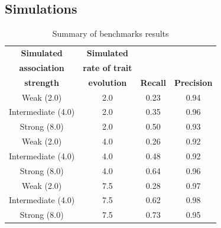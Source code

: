 \documentclass[]{article}
\begin{document}
\subsection*{Simulations}
\begin{table}[h!]
	\centering
	\caption{\label{tab:results} Summary of benchmarks results}	
	\small
	\begin{tabular}{cccc}
		\midrule
		\textbf{Simulated} & \textbf{Simulated} & & \\
		\textbf{association}  & \textbf{rate of trait} & & \\
		\textbf{strength} & \textbf{evolution} & \textbf{Recall} & \textbf{Precision}\\
		\midrule
		Weak (2.0) & 2.0 & 0.23 & 0.94\\
		Intermediate (4.0) & 2.0 & 0.35 & 0.96\\
		Strong (8.0) & 2.0 & 0.50 & 0.93\\
		Weak (2.0) & 4.0 & 0.26 & 0.92\\
		Intermediate (4.0) & 4.0 & 0.48 & 0.92\\
		Strong (8.0) & 4.0 & 0.64 & 0.96\\
		Weak (2.0) & 7.5 & 0.28 & 0.97\\
		Intermediate (4.0) & 7.5 & 0.62 & 0.98\\
		Strong (8.0) & 7.5 & 0.73 & 0.95\\
		\midrule
	\end{tabular}
\end{table}
\end{document}
